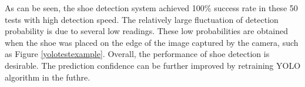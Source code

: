 \begin{table}[H]
\centering
{}
\caption{The testing results of YOLO shoe detection}
\label{yolotest}
\end{table}

As can be seen, the shoe detection system achieved 100\% success rate in these 50 tests with high detection speed. The relatively large fluctuation of detection probability is due to several low readings. These low probabilities are obtained when the shoe was placed on the edge of the image captured by the camera, such as Figure \ref{yolotestexample}. Overall, the performance of shoe detection is desirable. The prediction confidence can be further improved by retraining YOLO algorithm in the futhre.

